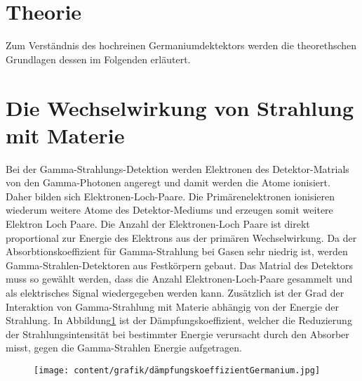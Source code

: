 \section{Theorie}
\label{sec:theorie}

Zum Verständnis des hochreinen Germaniumdektektors werden die theorethschen Grundlagen dessen im Folgenden erläutert.

\section{Die Wechselwirkung von Strahlung mit Materie}
\label{sec:WW mit Materie}

Bei der Gamma-Strahlungs-Detektion werden Elektronen des Detektor-Matrials von den Gamma-Photonen angeregt und damit werden die 
Atome ionisiert. Daher bilden sich Elektronen-Loch-Paare. Die Primärenelektronen ionisieren wiederum weitere Atome des Detektor-Mediums und erzeugen somit weitere Elektron Loch Paare.
Die Anzahl der Elektronen-Loch Paare ist direkt proportional zur Energie des Elektrons aus der primären
Wechselwirkung. Da der Absorbtionskoeffizient für Gamma-Strahlung bei Gasen sehr niedrig ist, 
werden Gamma-Strahlen-Detektoren aus Festkörpern gebaut. Das Matrial des Detektors muss so gewählt werden, dass
die Anzahl Elektronen-Loch-Paare gesammelt und als elektrisches Signal wiedergegeben werden kann.
Zusätzlich ist der Grad der Interaktion von Gamma-Strahlung mit Materie abhängig von der Energie der Strahlung.
In Abbildung\ref{fig:koeffizient} ist der Dämpfungskoeffizient, welcher die Reduzierung der Strahlungsintensität
bei bestimmter Energie verursacht durch den Absorber misst, gegen die Gamma-Strahlen Energie aufgetragen.

\begin{figure}[H]
    \centering
    \texttt{[image: content/grafik/dämpfungskoeffizientGermanium.jpg]}
    \caption{ \cite{gamma_ray}}
    \label{fig:koeffizient}
\end{figure}